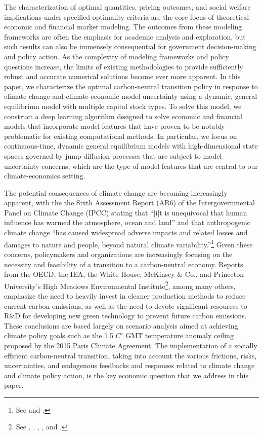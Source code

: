 \documentclass[12pt]{article}
\begin{document}
The characterization of optimal quantities, pricing outcomes, and social welfare implications under specified optimality criteria are the core focus of theoretical economic and financial market modeling. The outcomes from these modeling frameworks are often the emphasis for academic analysis and exploration, but such results can also be immensely consequential for government decision-making and policy action. As the complexity of modeling frameworks and policy questions increase, the limits of existing methodologies to provide sufficiently robust and accurate numerical solutions become ever more apparent. In this paper, we characterize the optimal carbon-neutral transition policy in response to climate change and climate-economic model uncertainty using a dynamic, general equilibrium model with multiple capital stock types. To solve this model, we construct a deep learning algorithm designed to solve economic and financial models that incorporate model features that have proven to be notably problematic for existing computational methods. In particular, we focus on continuous-time, dynamic general equilibrium models with high-dimensional state spaces governed by jump-diffusion processes that are subject to model uncertainty concerns, which are the type of model features that are central to our climate-economics setting.

The potential consequences of climate change are becoming increasingly apparent, with the the Sixth Assessment Report (AR6) of the Intergovernmental Panel on Climate Change (IPCC) stating that ``[i]t is unequivocal that human influence has warmed the atmosphere, ocean and land'' and that anthropogenic climate change ``has caused widespread adverse impacts and related losses and damages to nature and people, beyond natural climate variability.''\footnote{See \cite{RN2} and \cite{RN14}.} Given these concerns, policymakers and organizations are increasingly focusing on the necessity and feasibility of a transition to a carbon-neutral economy. Reports from the OECD, the IEA, the White House, McKinsey \& Co., and Princeton University's High Meadows Environmental Institute\footnote{See \cite{oecd_report}, \cite{bouckaert2021net}, \cite{house2021long}, \cite{mckinsey2022net}, and \cite{jenkinsmission}.}, among many others, emphasize the need to heavily invest in cleaner production methods to reduce current carbon emissions, as well as the need to devote significant resources to R\&D for developing new green technology to prevent future carbon emissions. These conclusions are based largely on scenario analysis aimed at achieving climate policy goals such as the 1.5 $C^{\circ}$ GMT temperature anomaly ceiling proposed by the 2015 Paris Climate Agreement. The implementation of a socially efficient carbon-neutral transition, taking into account the various frictions, risks, uncertainties, and endogenous feedbacks and responses related to climate change and climate policy action, is the key economic question that we address in this paper. 
\end{document}
